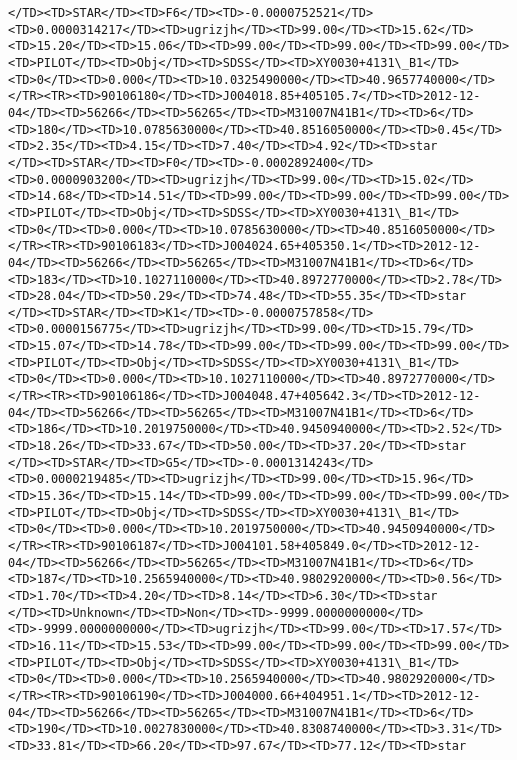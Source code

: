 \documentclass[11pt]{article}
\begin{document}
\begin{Verbatim}[commandchars=\\\{\}]
</TD><TD>STAR</TD><TD>F6</TD><TD>-0.0000752521</TD><TD>0.0000314217</TD><TD>ugrizjh</TD><TD>99.00</TD><TD>15.62</TD><TD>15.20</TD><TD>15.06</TD><TD>99.00</TD><TD>99.00</TD><TD>99.00</TD><TD>PILOT</TD><TD>Obj</TD><TD>SDSS</TD><TD>XY0030+4131\_B1</TD><TD>0</TD><TD>0.000</TD><TD>10.0325490000</TD><TD>40.9657740000</TD></TR><TR><TD>90106180</TD><TD>J004018.85+405105.7</TD><TD>2012-12-04</TD><TD>56266</TD><TD>56265</TD><TD>M31007N41B1</TD><TD>6</TD><TD>180</TD><TD>10.0785630000</TD><TD>40.8516050000</TD><TD>0.45</TD><TD>2.35</TD><TD>4.15</TD><TD>7.40</TD><TD>4.92</TD><TD>star      </TD><TD>STAR</TD><TD>F0</TD><TD>-0.0002892400</TD><TD>0.0000903200</TD><TD>ugrizjh</TD><TD>99.00</TD><TD>15.02</TD><TD>14.68</TD><TD>14.51</TD><TD>99.00</TD><TD>99.00</TD><TD>99.00</TD><TD>PILOT</TD><TD>Obj</TD><TD>SDSS</TD><TD>XY0030+4131\_B1</TD><TD>0</TD><TD>0.000</TD><TD>10.0785630000</TD><TD>40.8516050000</TD></TR><TR><TD>90106183</TD><TD>J004024.65+405350.1</TD><TD>2012-12-04</TD><TD>56266</TD><TD>56265</TD><TD>M31007N41B1</TD><TD>6</TD><TD>183</TD><TD>10.1027110000</TD><TD>40.8972770000</TD><TD>2.78</TD><TD>28.04</TD><TD>50.29</TD><TD>74.48</TD><TD>55.35</TD><TD>star      </TD><TD>STAR</TD><TD>K1</TD><TD>-0.0000757858</TD><TD>0.0000156775</TD><TD>ugrizjh</TD><TD>99.00</TD><TD>15.79</TD><TD>15.07</TD><TD>14.78</TD><TD>99.00</TD><TD>99.00</TD><TD>99.00</TD><TD>PILOT</TD><TD>Obj</TD><TD>SDSS</TD><TD>XY0030+4131\_B1</TD><TD>0</TD><TD>0.000</TD><TD>10.1027110000</TD><TD>40.8972770000</TD></TR><TR><TD>90106186</TD><TD>J004048.47+405642.3</TD><TD>2012-12-04</TD><TD>56266</TD><TD>56265</TD><TD>M31007N41B1</TD><TD>6</TD><TD>186</TD><TD>10.2019750000</TD><TD>40.9450940000</TD><TD>2.52</TD><TD>18.26</TD><TD>33.67</TD><TD>50.00</TD><TD>37.20</TD><TD>star      </TD><TD>STAR</TD><TD>G5</TD><TD>-0.0001314243</TD><TD>0.0000219485</TD><TD>ugrizjh</TD><TD>99.00</TD><TD>15.96</TD><TD>15.36</TD><TD>15.14</TD><TD>99.00</TD><TD>99.00</TD><TD>99.00</TD><TD>PILOT</TD><TD>Obj</TD><TD>SDSS</TD><TD>XY0030+4131\_B1</TD><TD>0</TD><TD>0.000</TD><TD>10.2019750000</TD><TD>40.9450940000</TD></TR><TR><TD>90106187</TD><TD>J004101.58+405849.0</TD><TD>2012-12-04</TD><TD>56266</TD><TD>56265</TD><TD>M31007N41B1</TD><TD>6</TD><TD>187</TD><TD>10.2565940000</TD><TD>40.9802920000</TD><TD>0.56</TD><TD>1.70</TD><TD>4.20</TD><TD>8.14</TD><TD>6.30</TD><TD>star      </TD><TD>Unknown</TD><TD>Non</TD><TD>-9999.0000000000</TD><TD>-9999.0000000000</TD><TD>ugrizjh</TD><TD>99.00</TD><TD>17.57</TD><TD>16.11</TD><TD>15.53</TD><TD>99.00</TD><TD>99.00</TD><TD>99.00</TD><TD>PILOT</TD><TD>Obj</TD><TD>SDSS</TD><TD>XY0030+4131\_B1</TD><TD>0</TD><TD>0.000</TD><TD>10.2565940000</TD><TD>40.9802920000</TD></TR><TR><TD>90106190</TD><TD>J004000.66+404951.1</TD><TD>2012-12-04</TD><TD>56266</TD><TD>56265</TD><TD>M31007N41B1</TD><TD>6</TD><TD>190</TD><TD>10.0027830000</TD><TD>40.8308740000</TD><TD>3.31</TD><TD>33.81</TD><TD>66.20</TD><TD>97.67</TD><TD>77.12</TD><TD>star      
\end{Verbatim}
\end{document}
